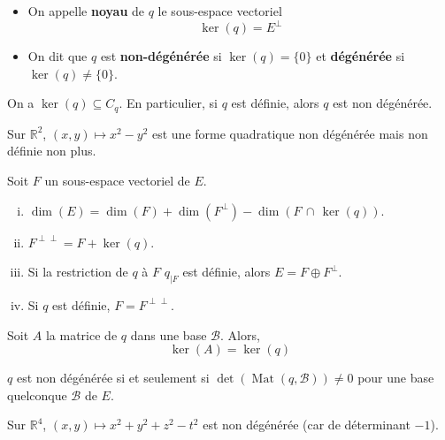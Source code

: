 	\begin{definition}
		\begin{itemize}
			\item On appelle \textbf{noyau} de $q$ le sous-espace vectoriel
			\[ \ker(q) = E^{\perp} \]
			\item On dit que $q$ est \textbf{non-dégénérée} si $\ker(q) = \{ 0 \}$ et \textbf{dégénérée} si $\ker(q) \neq \{ 0 \}$.
		\end{itemize}
	\end{definition}
	
	\begin{proposition}
		On a $\ker(q) \subseteq C_q$. En particulier, si $q$ est définie, alors $q$ est non dégénérée.
	\end{proposition}
	
	\begin{example}
		Sur $\mathbb{R}^2$, $(x, y) \mapsto x^2 - y^2$ est une forme quadratique non dégénérée mais non définie non plus.
	\end{example}
	
	\begin{proposition}
		Soit $F$ un sous-espace vectoriel de $E$.
		\begin{enumerate}[(i)]
			\item $\dim(E) = \dim(F) + \dim(F^\perp) - \dim(F \, \cap \, \ker(q))$.
			\item $F^{\perp\perp} = F + \ker(q)$.
			\item Si la restriction de $q$ à $F$ $q_{|F}$ est définie, alors $E = F \oplus F^{\perp}$.
			\item Si $q$ est définie, $F = F^{\perp\perp}$.
		\end{enumerate}
	\end{proposition}
	
	\begin{proposition}
		Soit $A$ la matrice de $q$ dans une base $\mathcal{B}$. Alors,
		\[ \ker(A) = \ker(q) \]
	\end{proposition}
	
	
	\begin{corollary}
		$q$ est non dégénérée si et seulement si $\det(\operatorname{Mat}(q, \mathcal{B})) \neq 0$ pour une base quelconque $\mathcal{B}$ de $E$.
	\end{corollary}
	
	\begin{example}
		Sur $\mathbb{R}^4$, $(x, y) \mapsto x^2 + y^2 + z^2 - t^2$ est non dégénérée (car de déterminant $-1$).
	\end{example}
	
